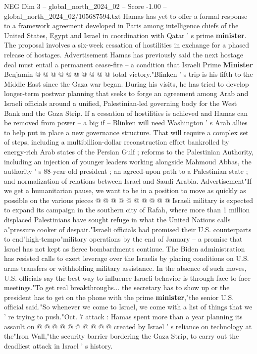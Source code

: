 \begin{textsample}{NEG Dim 3 – global\_north\_2024\_02 – Score -1.00 – global\_north\_2024\_02/105687594.txt}
Hamas has yet to offer a formal response to a framework agreement developed in Paris among intelligence chiefs of the United States, Egypt and Israel in coordination with Qatar ' s prime \textbf{minister}.
The proposal involves a six-week cessation of hostilities in exchange for a phased release of hostages.
Advertisement Hamas has previously said the next hostage deal must entail a permanent cease-fire -- a condition that Israeli Prime \textbf{Minister} Benjamin @ @ @ @ @ @ @ @ @ @ total victory."Blinken ' s trip is his fifth to the Middle East since the Gaza war began.
During his visits, he has tried to develop longer-term postwar planning that seeks to forge an agreement among Arab and Israeli officials around a unified, Palestinian-led governing body for the West Bank and the Gaza Strip.
If a cessation of hostilities is achieved and Hamas can be removed from power -- a big if -- Blinken will need Washington ' s Arab allies to help put in place a new governance structure.
That will require a complex set of steps, including a multibillion-dollar reconstruction effort bankrolled by energy-rich Arab states of the Persian Gulf ; reforms to the Palestinian Authority, including an injection of younger leaders working alongside Mahmoud Abbas, the authority ' s 88-year-old president ; an agreed-upon path to a Palestinian state ; and normalization of relations between Israel and Saudi Arabia.
Advertisement"If we get a humanitarian pause, we want to be in a position to move as quickly as possible on the various pieces @ @ @ @ @ @ @ @ @ @ Israeli military is expected to expand its campaign in the southern city of Rafah, where more than 1 million displaced Palestinians have sought refuge in what the United Nations calls a"pressure cooker of despair."Israeli officials had promised their U.S. counterparts to end"high-tempo"military operations by the end of January -- a promise that Israel has not kept as fierce bombardments continue.
The Biden administration has resisted calls to exert leverage over the Israelis by placing conditions on U.S. arms transfers or withholding military assistance.
In the absence of such moves, U.S. officials say the best way to influence Israeli behavior is through face-to-face meetings."To get real breakthroughs... the secretary has to show up or the president has to get on the phone with the prime \textbf{minister},"the senior U.S. official said."So whenever we come to Israel, we come with a list of things that we ' re trying to push."Oct. 7 attack : Hamas spent more than a year planning its assault on @ @ @ @ @ @ @ @ @ @ created by Israel ' s reliance on technology at the"Iron Wall,"the security barrier bordering the Gaza Strip, to carry out the deadliest attack in Israel ' s history.

\end{textsample}
